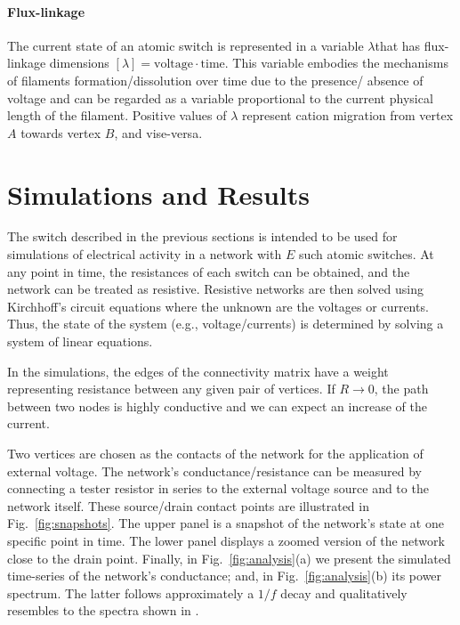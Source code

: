 \documentclass[preprint,10pt, authoryear, a4]{elsarticle}
\begin{document}
\paragraph{Flux-linkage} The current state of an atomic switch is represented in a variable
$\lambda$that has flux-linkage dimensions
$\left[\lambda\right]=\mbox{voltage}\cdot\mbox{time}$. This variable embodies
the mechanisms of filaments formation/dissolution over time due to the
presence/ absence of voltage and can be regarded as a variable proportional to
the current physical length of the filament.  Positive values of $\lambda$
represent cation migration from vertex $A$ towards vertex $B$, and vise-versa.




\section{Simulations and Results}
\label{sec:results}

The switch described in the previous sections is intended to be used for
simulations of electrical activity in a network with $E$ such atomic switches.
At any point in time, the resistances of each switch can be obtained, and the
network can be treated as resistive. Resistive networks are then solved using
Kirchhoff's circuit equations where the unknown are the voltages or currents.
Thus, the state of the system (e.g., voltage/currents) is determined by
solving a system of linear equations.

In the simulations, the edges of the connectivity matrix have a weight representing resistance
between any given pair of vertices. If $R\rightarrow0$, the path
between two nodes is highly conductive and we can expect an increase of the
current. 


Two vertices are chosen as the contacts of the network for the application of
external voltage. The network's conductance/resistance can be measured by
connecting a tester resistor in series to the external voltage source and to
the network itself. These source/drain contact points are illustrated in
Fig.~\ref{fig:snapshots}. The upper panel is a snapshot of the network's state
at one specific point in time.  The lower panel displays a zoomed version of
the network close to the drain point. Finally, in Fig.~\ref{fig:analysis}(a)
we present the simulated time-series of the network's conductance; and, in
Fig.~\ref{fig:analysis}(b) its power spectrum. The latter follows
approximately a $1/f$ decay and qualitatively resembles to the spectra shown
in \citet{Higuchi_2016}.
\end{document}
